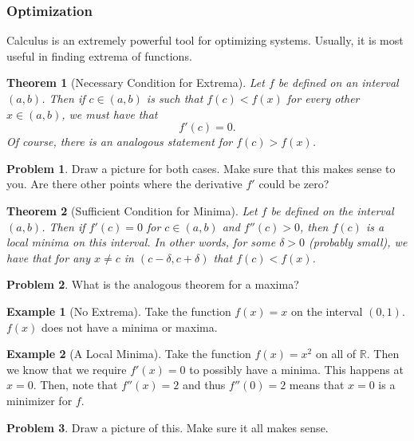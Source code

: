 \documentclass[12pt]{article}
\newcommand{\R}{\mathbb{R}}
\newtheorem{theorem}{Theorem}[section]
\theoremstyle{definition}
\newtheorem{example}{Example}[section]
\newtheorem{problem}{Problem}[section]
\begin{document}
\subsubsection{Optimization}

Calculus is an extremely powerful tool for optimizing systems.  Usually, it is most useful in finding extrema of functions.

\begin{theorem}[Necessary Condition for Extrema]
Let $f$ be defined on an interval $(a,b)$.  Then if $c\in (a,b)$ is such that $f(c)<f(x)$ for every other $x\in (a,b)$, we must have that
\[
f'(c)=0.
\]
Of course, there is an analogous statement for $f(c)>f(x)$.
\end{theorem}

\begin{problem}
Draw a picture for both cases. Make sure that this makes sense to you. Are there other points where the derivative $f'$ could be zero?
\end{problem}

\begin{theorem}[Sufficient Condition for Minima]
Let $f$ be defined on the interval $(a,b)$. Then if $f'(c)=0$ for $c\in (a,b)$ and $f''(c)>0$, then $f(c)$ is a local minima on this interval. In other words, for some $\delta>0$ (probably small), we have that for any $x\neq c$ in $(c-\delta,c+\delta)$ that $f(c)<f(x)$.
\end{theorem}

\begin{problem}
What is the analogous theorem for a maxima?
\end{problem}

\begin{example}[No Extrema]
Take the function $f(x)=x$ on the interval $(0,1)$. $f(x)$ does not have a minima or maxima.
\end{example}

\begin{example}[A Local Minima]
Take the function $f(x)=x^2$ on all of $\R$.  Then we know that we require $f'(x)=0$ to possibly have a minima.  This happens at $x=0$. Then, note that $f''(x)=2$ and thus $f''(0)=2$ means that $x=0$ is a minimizer for $f$.
\end{example}

\begin{problem}
Draw a picture of this. Make sure it all makes sense.
\end{problem}
\end{document}

